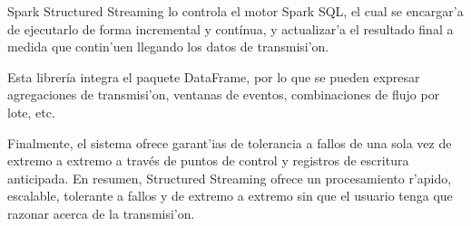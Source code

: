 Spark Structured Streaming lo controla el motor Spark SQL, el cual se encargar'a de ejecutarlo de forma incremental y contínua, y actualizar'a el resultado final a medida que contin'uen llegando los datos de transmisi'on. 

Esta librería integra el paquete DataFrame, por lo que se pueden expresar agregaciones de transmisi'on, ventanas de eventos, combinaciones de flujo por lote, etc.

Finalmente, el sistema ofrece garant'ias de tolerancia a fallos de una sola vez de extremo a extremo a través de puntos de control y registros de escritura anticipada. En resumen, Structured Streaming ofrece un procesamiento r'apido, escalable, tolerante a fallos y de extremo a extremo sin que el usuario tenga que razonar acerca de la transmisi'on.\cite{spark3}



\clearpage